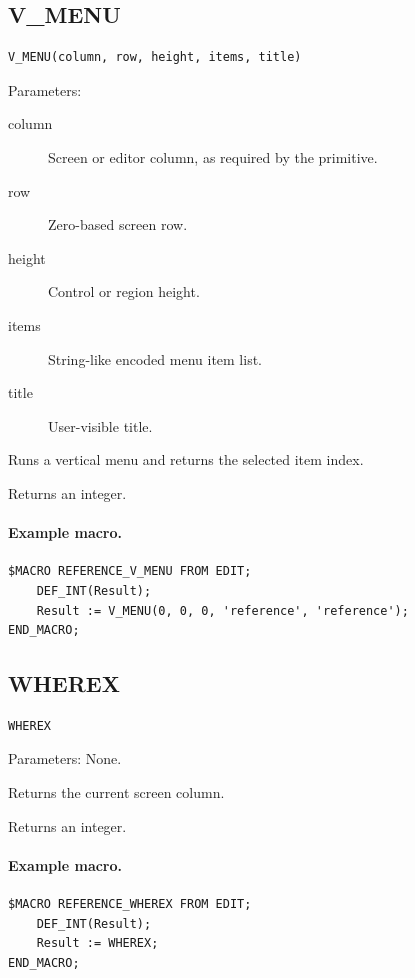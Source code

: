 \documentclass[a4paper,10pt,twoside,openany]{book}
\begin{document}
\label{prim:intrinsic-v-menu}
\subsection*{V\_MENU}
\begin{verbatim}
V_MENU(column, row, height, items, title)
\end{verbatim}
Parameters:
\begin{description}
\item[column] Screen or editor column, as required by the primitive.
\item[row] Zero-based screen row.
\item[height] Control or region height.
\item[items] String-like encoded menu item list.
\item[title] User-visible title.
\end{description}

Runs a vertical menu and returns the selected item index.

Returns an integer.

\paragraph{Example macro.}
\begin{verbatim}
$MACRO REFERENCE_V_MENU FROM EDIT;
    DEF_INT(Result);
    Result := V_MENU(0, 0, 0, 'reference', 'reference');
END_MACRO;
\end{verbatim}

\label{prim:intrinsic-wherex}
\subsection*{WHEREX}
\begin{verbatim}
WHEREX
\end{verbatim}
Parameters: None.

Returns the current screen column.

Returns an integer.

\paragraph{Example macro.}
\begin{verbatim}
$MACRO REFERENCE_WHEREX FROM EDIT;
    DEF_INT(Result);
    Result := WHEREX;
END_MACRO;
\end{verbatim}
\end{document}
